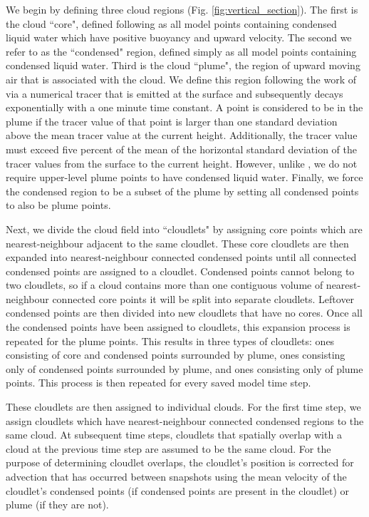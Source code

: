 \documentclass[acp]{copernicus}
\begin{document}
We begin by defining three cloud regions (Fig. \ref{fig:vertical_section}).  
The first is the cloud ``core", defined following \cite{Siebesma1995} as all 
model points containing condensed liquid water which have positive buoyancy and 
upward velocity.  The second we refer to as the ``condensed" region, defined 
simply as all model points containing condensed liquid water.  Third is the 
cloud ``plume", the region of upward moving air that is associated with the 
cloud.  We define this region following the work of \cite{Couvreaux2010} via a 
numerical tracer that is emitted at the surface and subsequently decays 
exponentially with a one minute time constant.  A point is considered to be in 
the plume if the tracer value of that point is larger than one standard 
deviation above the mean tracer value at the current height.  Additionally, 
the tracer value must exceed five percent of the mean of the horizontal 
standard deviation of the tracer values from the surface to the current height.  
However, unlike \citeauthor{Couvreaux2010}, we do not require upper-level 
plume points to have condensed liquid water.  Finally, we force the condensed 
region to be a subset of the plume by setting all condensed points to also be 
plume points.

Next, we divide the cloud field into ``cloudlets" by assigning core points 
which are nearest-neighbour adjacent to the same cloudlet.  These core 
cloudlets are then expanded into nearest-neighbour connected condensed points 
until all connected condensed points are assigned to a cloudlet.  Condensed 
points cannot belong to two cloudlets, so if a cloud contains more than one 
contiguous volume of nearest-neighbour connected core points it will be split 
into separate cloudlets.  Leftover condensed points are then divided into new 
cloudlets that have no cores.  Once all the condensed points have been 
assigned to cloudlets, this expansion process is repeated for the plume points.  
This results in three types of cloudlets: ones consisting of core and condensed 
points surrounded by plume, ones consisting only of condensed points surrounded 
by plume, and ones consisting only of plume points. This process is then 
repeated for every saved model time step.

These cloudlets are then assigned to individual clouds.  For the first time 
step, we assign cloudlets which have nearest-neighbour connected condensed 
regions to the same cloud.  At subsequent time steps, cloudlets that spatially 
overlap with a cloud at the previous time step are assumed to be the same 
cloud.  For the purpose of determining cloudlet overlaps, the cloudlet's 
position is corrected for advection that has occurred between snapshots using 
the mean velocity of the cloudlet's condensed points (if condensed points are 
present in the cloudlet) or plume (if they are not).
\end{document}
